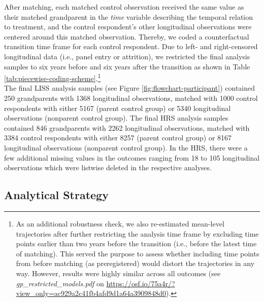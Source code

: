 \documentclass[
  english,
  man, noextraspace]{apa7}
\begin{document}
After matching, each matched control observation received the same value as their matched grandparent in the \emph{time} variable describing the temporal relation to treatment, and the control respondent's other longitudinal observations were centered around this matched observation. Thereby, we coded a counterfactual transition time frame for each control respondent. Due to left- and right-censored longitudinal data (i.e., panel entry or attrition), we restricted the final analysis samples to six years before and six years after the transition as shown in Table \ref{tab:piecewise-coding-scheme}.\footnote{As an additional robustness check, we also re-estimated mean-level trajectories after further restricting the analysis time frame by excluding time points earlier than two years before the transition (i.e., before the latest time of matching). This served the purpose to assess whether including time points from before matching (as preregistered) would distort the trajectories in any way. However, results were highly similar across all outcomes (see \emph{gp\_restricted\_models.pdf} on \url{https://osf.io/75a4r/?view_only=ac929a2c41fb4afd9d1a64a3909848d0}).}\\
The final LISS analysis samples (see Figure \ref{fig:flowchart-participant}) contained 250 grandparents with 1368 longitudinal observations, matched with 1000 control respondents with either 5167 (parent control group) or 5340 longitudinal observations (nonparent control group). The final HRS analysis samples contained 846 grandparents with 2262 longitudinal observations, matched with 3384 control respondents with either 8257 (parent control group) or 8167 longitudinal observations (nonparent control group). In the HRS, there were a few additional missing values in the outcomes ranging from 18 to 105 longitudinal observations which were listwise deleted in the respective analyses.

\hypertarget{analytical-strategy}{%
\subsection{Analytical Strategy}\label{analytical-strategy}}
\end{document}
